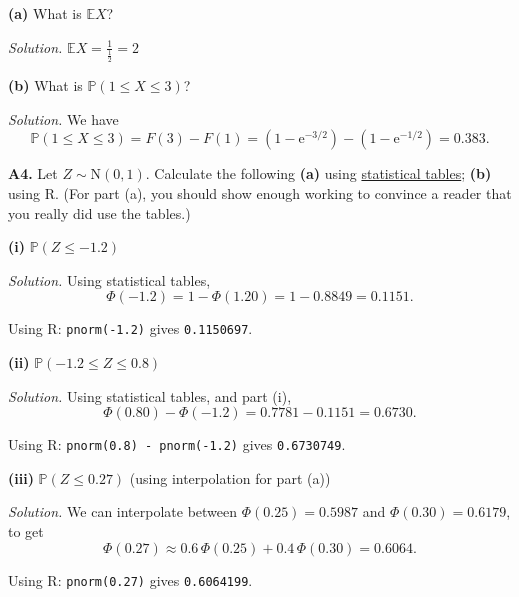 \documentclass[
  a4paper,
]{book}
\theoremstyle{definition}
\theoremstyle{definition}
\theoremstyle{definition}
\theoremstyle{definition}
\theoremstyle{remark}
\begin{document}
\textbf{(a)} What is \(\mathbb EX\)?

\begin{myanswers}
\emph{Solution.} \(\mathbb EX = \displaystyle\frac{1}{\frac12} = 2\)

\end{myanswers}

\textbf{(b)} What is \(\mathbb P(1 \leq X \leq 3)\)?

\begin{myanswers}
\emph{Solution.} We have
\[ \mathbb P(1 \leq X \leq 3) = F(3) - F(1) = (1 - \mathrm e^{-3/2}) - (1 - \mathrm e^{-1/2}) = 0.383 . \]

\end{myanswers}

\textbf{A4.} Let \(Z \sim \mathrm{N}(0,1)\). Calculate the following \textbf{(a)} using \href{https://mpaldridge.github.io/math1710/stat-tab.pdf}{statistical tables}; \textbf{(b)} using R. (For part (a), you should show enough working to convince a reader that you really did use the tables.)

\textbf{(i)} \(\mathbb P(Z \leq -1.2)\)

\begin{myanswers}
\emph{Solution.} Using statistical tables,
\[ \Phi(-1.2) = 1 - \Phi(1.20) = 1 - 0.8849 = 0.1151 .\]

Using R: \texttt{pnorm(-1.2)} gives \texttt{0.1150697}.

\end{myanswers}

\textbf{(ii)} \(\mathbb P(-1.2 \leq Z \leq 0.8)\)

\begin{myanswers}
\emph{Solution.} Using statistical tables, and part (i),
\[ \Phi(0.80) - \Phi(-1.2) = 0.7781 - 0.1151 = 0.6730 . \]

Using R: \texttt{pnorm(0.8)\ -\ pnorm(-1.2)} gives \texttt{0.6730749}.

\end{myanswers}

\textbf{(iii)} \(\mathbb P(Z \leq 0.27)\) (using interpolation for part (a))

\begin{myanswers}
\emph{Solution.} We can interpolate between \(\Phi(0.25) = 0.5987\) and \(\Phi(0.30) = 0.6179\), to get
\[ \Phi(0.27) \approx 0.6 \,\Phi(0.25) + 0.4\, \Phi(0.30) = 0.6064 . \]

Using R: \texttt{pnorm(0.27)} gives \texttt{0.6064199}.

\end{myanswers}
\end{document}
